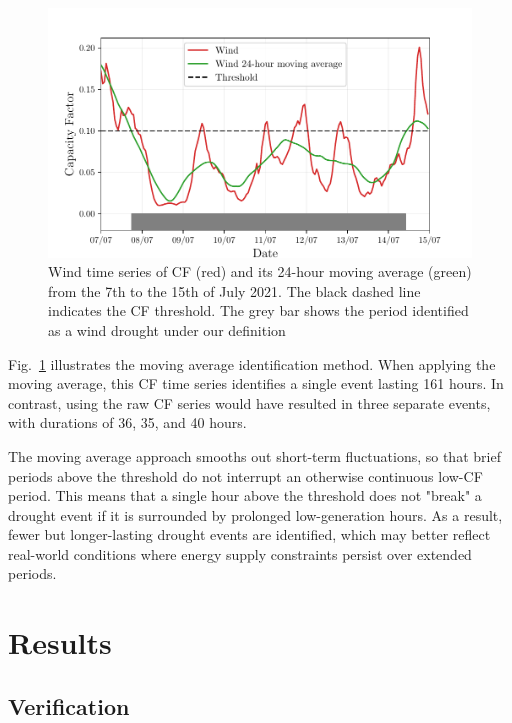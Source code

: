 \documentclass[a4paper, 11pt]{article}
\begin{document}
\begin{figure}[ht!]
	\centering
	\includegraphics[width=\textwidth]{droughts_methodology}
	\caption{Wind time series of CF (red) and its 24-hour moving average (green) from the 7th to the 15th of July 2021. The black dashed line indicates the CF threshold. The grey bar shows the period identified as a wind drought under our definition}
	\label{fig:find_res_droughts}
\end{figure}

Fig.~\ref{fig:find_res_droughts} illustrates the moving average identification method. When applying the moving average, this CF time series identifies a single event lasting 161 hours. In contrast, using the raw CF series would have resulted in three separate events, with durations of 36, 35, and 40 hours.

The moving average approach smooths out short-term fluctuations, so that brief periods above the threshold do not interrupt an otherwise continuous low-CF period. This means that a single hour above the threshold does not "break" a drought event if it is surrounded by prolonged low-generation hours. As a result, fewer but longer-lasting drought events are identified, which may better reflect real-world conditions where energy supply constraints persist over extended periods.

\section{Results}
\label{sec:Results}

\subsection{Verification}
\label{sec:verification}
\end{document}
